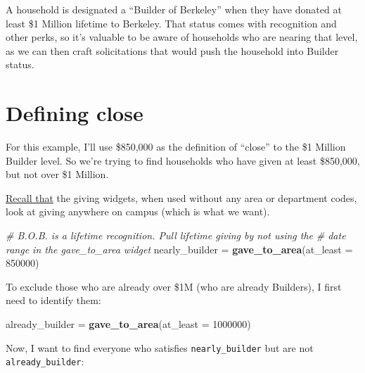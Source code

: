 \documentclass[]{book}
\newenvironment{Shaded}{\begin{snugshade}}{\end{snugshade}}
\newcommand{\CommentTok}[1]{\textcolor[rgb]{0.56,0.35,0.01}{\textit{#1}}}
\newcommand{\DataTypeTok}[1]{\textcolor[rgb]{0.13,0.29,0.53}{#1}}
\newcommand{\DecValTok}[1]{\textcolor[rgb]{0.00,0.00,0.81}{#1}}
\newcommand{\KeywordTok}[1]{\textcolor[rgb]{0.13,0.29,0.53}{\textbf{#1}}}
\newcommand{\NormalTok}[1]{#1}
\newcommand{\OperatorTok}[1]{\textcolor[rgb]{0.81,0.36,0.00}{\textbf{#1}}}
\newcommand{\StringTok}[1]{\textcolor[rgb]{0.31,0.60,0.02}{#1}}
\begin{document}
A household is designated a ``Builder of Berkeley'' when they have donated at least \$1 Million lifetime to Berkeley. That status comes with recognition and other perks, so it's valuable to be aware of households who are nearing that level, as we can then craft solicitations that would push the household into Builder status.

\hypertarget{defining-close}{%
\section{Defining close}\label{defining-close}}

For this example, I'll use \$850,000 as the definition of ``close'' to the \$1 Million Builder level. So we're trying to find households who have given at least \$850,000, but not over \$1 Million.

\protect\hyperlink{use-defaults}{Recall that} the giving widgets, when used without any area or department codes, look at giving anywhere on campus (which is what we want).

\begin{Shaded}
\begin{Highlighting}[]
\CommentTok{# B.O.B. is a lifetime recognition. Pull lifetime giving by not using the }
\CommentTok{# date range in the gave_to_area widget}
\NormalTok{nearly_builder =}\StringTok{ }\KeywordTok{gave_to_area}\NormalTok{(}\DataTypeTok{at_least =} \DecValTok{850000}\NormalTok{)}
\end{Highlighting}
\end{Shaded}

To exclude those who are already over \$1M (who are already Builders), I first need to identify them:

\begin{Shaded}
\begin{Highlighting}[]
\NormalTok{already_builder =}\StringTok{ }\KeywordTok{gave_to_area}\NormalTok{(}\DataTypeTok{at_least =} \DecValTok{1000000}\NormalTok{)}
\end{Highlighting}
\end{Shaded}

Now, I want to find everyone who satisfies \texttt{nearly\_builder} but are not \texttt{already\_builder}:

\begin{Shaded}
\end{Shaded}
\end{document}
